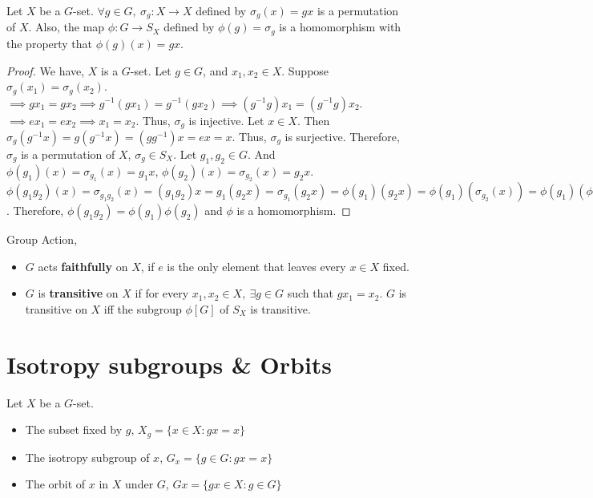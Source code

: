 \begin{theorem}
	Let $X$ be a $G$-set.
	$\forall g \in G,\ \sigma_g : X \to X$ defined by $\sigma_g(x) = gx$ is a permutation of $X$.
	Also, the map $\phi : G \to S_X$ defined by $\phi(g) = \sigma_g$ is a homomorphism with the property that $\phi(g)(x) = gx$.
\end{theorem}
\begin{proof}
	We have, $X$ is a $G$-set.
	Let $g \in G$, and $x_1,x_2 \in X$.
	Suppose $\sigma_g(x_1) = \sigma_g(x_2)$.
	$\implies gx_1 = gx_2 \implies g^{-1}(gx_1) = g^{-1}(gx_2) \implies (g^{-1}g)x_1 = (g^{-1}g)x_2$.
	$\implies ex_1 = ex_2 \implies x_1 = x_2$.
	Thus, $\sigma_g$ is injective.
	Let $x \in X$.
	Then $\sigma_g(g^{-1}x) = g(g^{-1}x) = (gg^{-1})x = ex = x$.
	Thus, $\sigma_g$ is surjective.
	Therefore, $\sigma_g$ is a permutation of $X$, $\sigma_g \in S_X$.
	Let $g_1,g_2 \in G$.
	And $\phi(g_1)(x) = \sigma_{g_1}(x) = g_1x$, $\phi(g_2)(x) = \sigma_{g_2}(x) = g_2x$.
	$\phi(g_1g_2)(x) = \sigma_{g_1g_2}(x) = (g_1g_2)x = g_1(g_2x) = \sigma_{g_1}(g_2x) = \phi(g_1)(g_2x) = \phi(g_1)(\sigma_{g_2}(x)) = \phi(g_1)(\phi(g_2)(x)) = \phi(g_1)\phi(g_2)(x)$.
	Therefore, $\phi(g_1g_2) = \phi(g_1)\phi(g_2)$ and $\phi$ is a homomorphism.
\end{proof}

\begin{definition}Group Action,
	\begin{itemize}
		\item $G$ acts \textbf{faithfully} on $X$, if $e$ is the only element that leaves every $x \in X$ fixed. 
		\item $G$ is \textbf{transitive} on $X$ if for every $x_1,x_2 \in X,\ \exists g \in G$ such that $gx_1 = x_2$.
			$G$ is transitive on $X$ iff the subgroup $\phi[G]$ of $S_X$ is transitive.
	\end{itemize}
\end{definition}

\section{Isotropy subgroups \& Orbits}
\begin{definition}Let $X$ be a $G$-set.
	\begin{itemize}
		\item The subset fixed by $g$, $X_g = \{ x \in X : gx = x \}$
		\item The isotropy subgroup of $x$, $G_x = \{ g \in G : gx = x \}$
		\item The orbit of $x$ in $X$ under $G$, $Gx = \{ gx \in X : g \in G \}$
	\end{itemize}
\end{definition}

